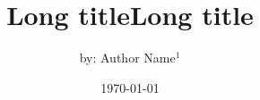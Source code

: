 \documentclass{beamer}
\author{{\small{by:}} Author Name$^1$}
\title[Short title]{Long title}
\institute{$^1$Department University1 \\ $^2$Department University2}
\date{\today}
\begin{document}
    \begin{frame}[plain]
        \maketitle
    \end{frame}

    \title[Short title]{Long title}

    \date{}
    \author{}
    \author{}
    \institute{}

    \begin{frame}\frametitle{}
        \maketitle
    \end{frame}
\end{document}
